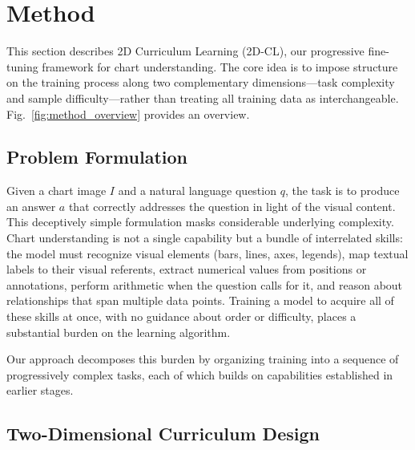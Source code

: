 ﻿\documentclass[journal]{IEEEtran}
\newcommand{\method}{2D-CL}
\newcommand{\fullmethod}{2D Curriculum Learning}
\begin{document}
\section{Method}
This section describes \fullmethod{} (\method{}), our progressive fine-tuning framework for chart understanding. The core idea is to impose structure on the training process along two complementary dimensions---task complexity and sample difficulty---rather than treating all training data as interchangeable. Fig.~\ref{fig:method_overview} provides an overview.

\subsection{Problem Formulation}
\label{sec:problem}
Given a chart image $I$ and a natural language question $q$, the task is to produce an answer $a$ that correctly addresses the question in light of the visual content. This deceptively simple formulation masks considerable underlying complexity. Chart understanding is not a single capability but a bundle of interrelated skills: the model must recognize visual elements (bars, lines, axes, legends), map textual labels to their visual referents, extract numerical values from positions or annotations, perform arithmetic when the question calls for it, and reason about relationships that span multiple data points. Training a model to acquire all of these skills at once, with no guidance about order or difficulty, places a substantial burden on the learning algorithm.

Our approach decomposes this burden by organizing training into a sequence of progressively complex tasks, each of which builds on capabilities established in earlier stages.

\subsection{Two-Dimensional Curriculum Design}
\label{sec:2d_curriculum}
\end{document}
